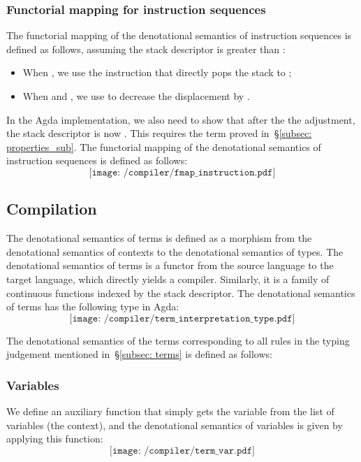 \documentclass[12pt,a4paper]{report}
\theoremstyle{definition}
\newcommand{\secref}[1]{\S\ref{#1}}
\newcommand{\mb}[1]{\textcolor{mediumblue}{#1}}
\newcommand{\ang}[1]{\left\langle #1 \right\rangle}
\begin{document}
    \subsubsection[Functorial mapping for instruction sequences]{Functorial mapping for instruction sequences}
    The functorial mapping of the denotational semantics of instruction sequences is defined as follows, assuming the stack descriptor \text{\textit{sd′} = \ang{f',d'}} is greater than \text{\textit{sd} = \ang{f,d}}:
    \begin{itemize}
        \item When , we use the  instruction that directly pops the stack to ;
        \item When  and , we use  to decrease the displacement by .
    \end{itemize}
    In the Agda implementation, we also need to show that after the the adjustment, the stack descriptor is now . This requires the term \text{\mb{\mathsf{n\mathord{-}[n\mathord{-}m]\mathord{\equiv}m}}} proved in~\secref{subsec: properties_sub}. The functorial mapping of the denotational semantics of instruction sequences is defined as follows:
    \[\texttt{[image: /compiler/fmap\_instruction.pdf]}\]

    \subsection{Compilation}
    The denotational semantics of terms is defined as a morphism from the denotational semantics of contexts to the denotational semantics of types. The denotational semantics of terms is a functor from the source language to the target language, which directly yields a compiler. Similarly, it is a family of continuous functions indexed by the stack descriptor. The denotational semantics of terms has the following type in Agda:
    \[\texttt{[image: /compiler/term\_interpretation\_type.pdf]}\]

    The denotational semantics of the terms corresponding to all rules in the typing judgement mentioned in~\secref{subsec: terms} is defined as follows: 

        \subsubsection{Variables}
        We define an auxiliary function that simply gets the variable from the list of variables (the context), and the denotational semantics of variables is given by applying this function:
        \[\texttt{[image: /compiler/term\_var.pdf]}\]
\end{document}
